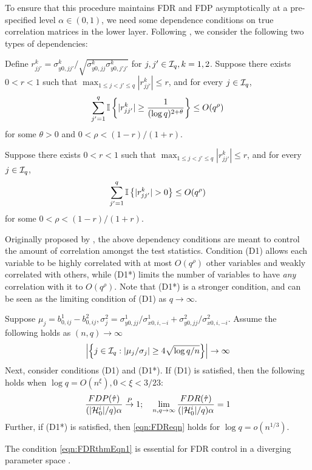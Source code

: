 To ensure that this procedure maintains FDR and FDP asymptotically at a pre-specified level $\alpha \in (0,1)$, we need some dependence conditions on true correlation matrices in the lower layer. Following \citet{LiuShao14}, we consider the following two types of dependencies:

 Define $r_{jj'}^k = \sigma_{y0,jj'}^k /\sqrt{\sigma_{y0,jj}^k \sigma_{y0,j'j'}^k}$ for $j,j' \in {\cal{I}}_q, k = 1,2$. Suppose there exists $0 < r < 1$ such that $\max_{1 \leq j < j' \leq q} | r_{jj'}^k | \leq r$, and for every $j \in {\cal{I}}_q$,
%
$$
\sum_{j'=1}^q {\mathbb{I}} \left\{ |r_{jj'}^k| \geq \frac{1}{(\log q)^{2 + \theta}} \right\} \leq O(q^\rho)
$$
%
for some $\theta > 0$ and $0 < \rho < (1-r)/(1+r)$.

 Suppose there exists $0 < r < 1$ such that $\max_{1 \leq j < j' \leq q} | r_{jj'}^k | \leq r$, and for every $j \in {\cal{I}}_q$,
%
$$
\sum_{j'=1}^q {\mathbb{I}} \left\{ |r_{jj'}^k| > 0 \right\} \leq O(q^\rho)
$$
%
for some $0 < \rho < (1-r)/(1+r)$.

Originally proposed by \citet{LiuShao14}, the above dependency conditions are meant to control the amount of correlation amongst the test statistics. Condition (D1) allows each variable to be highly correlated with at most $O(q^\rho)$ other variables and weakly correlated with others, while (D1*) limits the number of variables to have {\it any} correlation with it to $O(q^\rho)$. Note that (D1*) is a stronger condition, and can be seen as the limiting condition of (D1) as $q \rightarrow \infty$.

\begin{theorem}\label{thm:FDRthm}
Suppose $\mu_j = b_{0,ij}^1 - b_{0,ij}^2, \sigma_j^2 = \sigma_{y0,jj}^1/ \sigma_{x0,i,-i}^1 + \sigma_{y0,jj}^2/ \sigma_{x0,i,-i}^2$. Assume the following holds as $(n,q) \rightarrow \infty$
%
\begin{align}\label{eqn:FDRthmEqn1}
\left| \left\{ j \in {\cal{I}}_q: |\mu_j / \sigma_j | \geq
4 \sqrt{ \log q/n} \right\} \right| \rightarrow \infty
\end{align}
%
Next, consider conditions (D1) and (D1*). If (D1) is satisfied, then the following holds when $\log q = O(n^{\xi}), 0 < \xi < 3/23$:
%
\begin{align}\label{eqn:FDReqn}
\frac{FDP( \hat \tau)}{(| {\cal{H}}_0^i|/q) \alpha} \stackrel{P}{\rightarrow} 1; \quad
\lim_{n, q \rightarrow \infty} \frac{FDR( \hat \tau)}{(| {\cal{H}}_0^i|/q) \alpha} = 1
\end{align}
%
Further, if (D1*) is satisfied, then \eqref{eqn:FDReqn} holds for $\log q = o(n^{1/3})$.
\end{theorem}
%
The condition \eqref{eqn:FDRthmEqn1} is essential for FDR control in a diverging parameter space \citep{LiuShao14, Liu17}.

